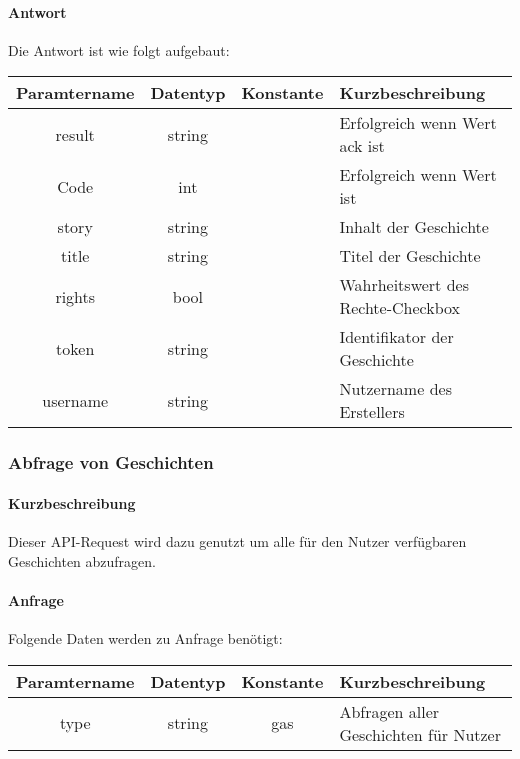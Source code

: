 \paragraph{Antwort}Die Antwort ist wie folgt aufgebaut:
\begin{table}[H]
	\begin{tabular}{|c|c|c|p{6.5cm}|}
		\hline
		\textbf{Paramtername} & \textbf{Datentyp} & \textbf{Konstante} & \textbf{Kurzbeschreibung}                                                                                               \\ \hline
		result              & string           &                 & Erfolgreich wenn Wert {\glqq ack\grqq} ist \\ \hline
		Code                & int              &                 & Erfolgreich wenn Wert {\glqq 0\grqq} ist \\ \hline
		story               & string           &                 & Inhalt der Geschichte \\ \hline
		title               & string           &                 & Titel der Geschichte \\ \hline
		rights              & bool             &                 & Wahrheitswert des Rechte-Checkbox \\ \hline
		token               & string           &                 & Identifikator der Geschichte \\ \hline
		username            & string           &                 & Nutzername des Erstellers \\ \hline
	\end{tabular}
\end{table}
\subsubsection{Abfrage von Geschichten}
\paragraph{Kurzbeschreibung}Dieser API-Request wird dazu genutzt um alle für den Nutzer verfügbaren Geschichten abzufragen.
\paragraph{Anfrage}Folgende Daten werden zu Anfrage benötigt:
\begin{table}[H]
	\begin{tabular}{|c|c|c|p{6.5cm}|}
		\hline
		\textbf{Paramtername} & \textbf{Datentyp} & \textbf{Konstante} & \textbf{Kurzbeschreibung}                                                                                               \\ \hline
		type                & string            & gas                & Abfragen aller Geschichten für Nutzer\\ \hline
	\end{tabular}
\end{table}
